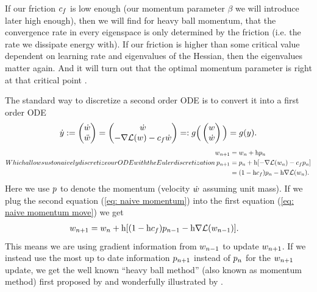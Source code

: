 If our friction \(c_f\) is low enough (our momentum parameter \(\beta\)
we will introduce later high enough), then we will find for heavy ball momentum,
that the convergence rate in every eigenspace is only determined by the friction
(i.e. the rate we dissipate energy with). If our friction is higher than some
critical value dependent on learning rate and eigenvalues of the Hessian, then
the eigenvalues matter again. And it will turn out that the optimal momentum
parameter is right at that critical point \parencite[see also ``critical
dampening'', e.g.][]{gohWhyMomentumReally2017}.

The standard way to discretize a second order ODE is to convert it into a first
order ODE
%
\begin{align*}
	\dot{y} := \begin{pmatrix}
		\dot{w}\\
		\ddot{w}
	\end{pmatrix}
	= \begin{pmatrix}
		\dot{w} \\
		-\nabla \mathcal{L}(w) - c_f \dot{w}
	\end{pmatrix}
	=: g\Big(\begin{pmatrix}
		w \\
		\dot{w}
	\end{pmatrix}\Big)
	= g(y).
\end{align*}
%
\begin{subequations}
Which allows us to naively discretize our ODE with the Euler discretization
\begin{align}
	\weights_{n+1} &= \weights_n + \lr \momentum_n \label{eq: naive momentum move}\\
	\momentum_{n+1} &= \momentum_n + \lr [-\nabla \Loss(\weights_n) - \friction \momentum_n]
	\label{eq: naive momentum}\\ \nonumber
	&= (1-\lr\friction)\momentum_n - \lr\nabla \Loss(\weights_n).
\end{align}
\end{subequations}
%
Here we use \(p\) to denote the momentum (velocity \(\dot{w}\)
assuming unit mass).
If we plug the second equation (\ref{eq: naive momentum}) into the first
equation (\ref{eq: naive momentum move}) we get
%
\begin{align*}
	w_{n+1}
	&= w_n + \text{h} [(1-\text{h}c_f)p_{n-1} - \text{h}\nabla \mathcal{L}(w_{n-1})].
\end{align*}
%
This means we are using gradient information from \(w_{n-1}\) to update
\(w_{n+1}\). If we instead use the most up to date information
\(p_{n+1}\) instead of \(p_n\) for the \(w_{n+1}\) update,
we get the well known ``heavy ball method'' (also known as momentum method) first proposed
by \textcite{polyakMethodsSpeedingConvergence1964} and wonderfully illustrated
by \textcite{gohWhyMomentumReally2017}.

